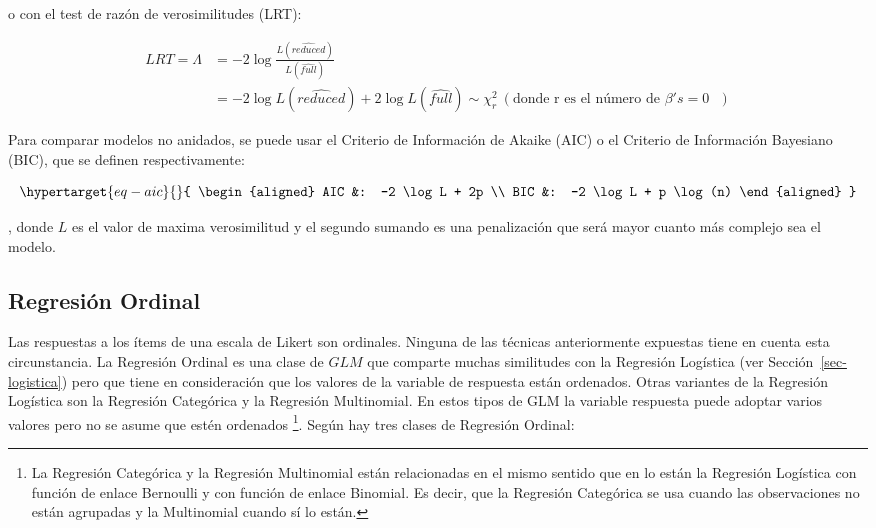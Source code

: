 \documentclass[
  12pt,
  a4paper,
  extrafontsizes,
  onecolumn,
  openright]{memoir}
\begin{document}
o con el test de razón de verosimilitudes (LRT):

\[
\begin{aligned}
LRT = \Lambda &= -2 \log \frac{L(\widehat{reduced})}{L(\widehat{full})}\\
&= -2 \log L(\widehat{reduced}) + 2 \log L(\widehat{full}) \sim \chi^2_r\ (\text{donde r es el número de $\beta 's = 0$ })
\end{aligned}
\]

Para comparar modelos no anidados, se puede usar el Criterio de
Información de Akaike (AIC) o el Criterio de Información Bayesiano
(BIC), que se definen respectivamente:

\begin{equation}\protect\hypertarget{eq-aic}{}{
\begin{aligned}
AIC &: -2 \log L + 2p \\
BIC &: -2 \log L + p \log(n)
\end{aligned}
}\label{eq-aic}\end{equation}

, donde \(L\) es el valor de maxima verosimilitud y el segundo sumando
es una penalización que será mayor cuanto más complejo sea el modelo.

\hypertarget{sec-ordinal}{%
\subsection{Regresión Ordinal}\label{sec-ordinal}}

Las respuestas a los ítems de una escala de Likert son ordinales.
Ninguna de las técnicas anteriormente expuestas tiene en cuenta esta
circunstancia. La Regresión Ordinal es una clase de \(GLM\) que comparte
muchas similitudes con la Regresión Logística (ver
Sección~\ref{sec-logistica}) pero que tiene en consideración que los
valores de la variable de respuesta están ordenados. Otras variantes de
la Regresión Logística son la Regresión Categórica y la Regresión
Multinomial. En estos tipos de GLM la variable respuesta puede adoptar
varios valores pero no se asume que estén ordenados \footnote{La
  Regresión Categórica y la Regresión Multinomial están relacionadas en
  el mismo sentido que en lo están la Regresión Logística con función de
  enlace Bernoulli y con función de enlace Binomial. Es decir, que la
  Regresión Categórica se usa cuando las observaciones no están
  agrupadas y la Multinomial cuando sí lo están.}. Según
\textcite{burkner2019} hay tres clases de Regresión Ordinal:
\end{document}
